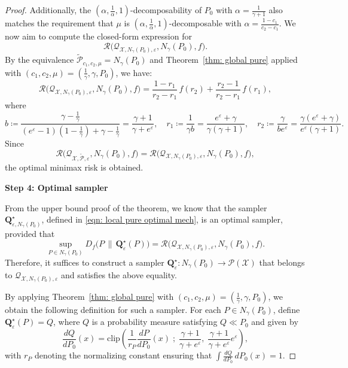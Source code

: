 \documentclass[accepted]{article}
\theoremstyle{plain} %
\theoremstyle{definition}
\theoremstyle{remark}
\newcommand{\eps}{\varepsilon}
\newcommand{\bQ}{\mathbf{Q}}
\newcommand{\ngb}{N_\gamma(P_0)}
\begin{document}
\begin{proof}
Additionally, the \((\alpha,\frac{1}{\alpha},1)\)-decomposability 
of \(P_0\) with \(\alpha = \tfrac{1}{\gamma + 1}\) also matches the requirement that $\mu$ is $(\alpha,\frac{1}{\alpha},1)$-decomposable with  
\(\alpha = \tfrac{1 - c_1}{c_2 - c_1}\). We now aim to compute the closed-form expression for
\[
\mathcal{R}\Big(\mathcal{Q}_{\mathcal{X}, N_\gamma(P_0), \varepsilon}, N_\gamma(P_0), f\Big).
\]
By the equivalence \(\tilde{\mathcal{P}}_{c_1, c_2, \mu} = N_\gamma(P_0)\) and Theorem~\ref{thm: global pure} applied with \((c_1, c_2, \mu) = \left(\tfrac{1}{\gamma}, \gamma, P_0\right)\), we have:
\[
\mathcal{R}\Big(\mathcal{Q}_{\mathcal{X}, N_\gamma(P_0), \varepsilon}, N_\gamma(P_0), f\Big)
= \frac{1 - r_1}{r_2 - r_1} \, f(r_2) + \frac{r_2 - 1}{r_2 - r_1} \, f(r_1),
\]
where
\[
b \coloneqq \frac{\gamma - \tfrac{1}{\gamma}}{(e^\varepsilon - 1)\left(1 - \tfrac{1}{\gamma}\right) + \gamma - \tfrac{1}{\gamma}} 
= \frac{\gamma + 1}{\gamma + e^\varepsilon}, \quad
r_1 \coloneqq \frac{1}{\gamma b} 
= \frac{e^\varepsilon + \gamma}{\gamma(\gamma + 1)}, \quad
r_2 \coloneqq \frac{\gamma}{b e^\varepsilon} 
= \frac{\gamma(e^\varepsilon + \gamma)}{e^\varepsilon(\gamma + 1)}.
\]
Since
\[
\mathcal{R}\Big(\mathcal{Q}_{\mathcal{X}, \tilde{\mathcal{P}}, \eps}, N_\gamma(P_0), f\Big) 
= \mathcal{R}\Big(\mathcal{Q}_{\mathcal{X}, N_\gamma(P_0), \eps}, N_\gamma(P_0), f\Big),
\] the optimal minimax risk is obtained.

\medskip

\textbf{Step 4: Optimal sampler} 

From the upper bound proof of the theorem, we know that the sampler 
\(\bQ^\star_{\varepsilon, N_\gamma(P_0)}\), defined in \eqref{eqn: local pure optimal mech}, is an optimal sampler, provided that
\[
\sup_{P \in N_\gamma(P_0)} D_f\big(P \, \| \, \bQ^\star_\varepsilon(P)\big)
= \mathcal{R}\Big(\mathcal{Q}_{\mathcal{X}, N_\gamma(P_0), \varepsilon}, N_\gamma(P_0), f\Big).
\]
Therefore, it suffices to construct a sampler 
\(\bQ^\star_\varepsilon : N_\gamma(P_0) \to \mathcal{P}(\mathcal{X})\) that belongs to $\mathcal{Q}_{\mathcal{X}, \ngb, \varepsilon}$
and satisfies the above equality.

By applying Theorem~\ref{thm: global pure} with 
\((c_1, c_2, \mu) = \left(\tfrac{1}{\gamma}, \gamma, P_0\right)\), 
we obtain the following definition for such a sampler. For each \(P \in N_\gamma(P_0)\), define \(\bQ^\star_\varepsilon(P) = Q\), where \(Q\) is a probability measure satisfying $Q \ll P_0$ and given by
\[
\frac{dQ}{dP_0}(x) 
= 
\mathrm{clip}\left(
\frac{1}{r_P} \frac{dP}{dP_0}(x)
\;;\;
\frac{\gamma + 1}{\gamma + e^\varepsilon},
\; \frac{\gamma + 1}{\gamma + e^\varepsilon} e^\varepsilon
\right),
\]
with \(r_P\) denoting the normalizing constant ensuring that 
\(\int \frac{dQ}{dP_0} \, dP_0(x) = 1\).


\end{proof}
\end{document}
